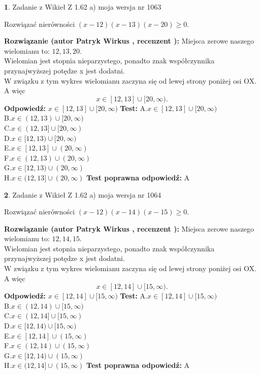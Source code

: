 \documentclass[12pt, a4paper]{article}
\theoremstyle{definition} %
\newtheorem{zad}{}
\newcommand{\zadStart}[1]{\begin{zad}#1\newline}
\newcommand{\zadStop}{\end{zad}}
\newcommand{\rozwStart}[2]{\noindent \textbf{Rozwiązanie (autor #1 , recenzent #2): }\newline}
\newcommand{\rozwStop}{\newline}
\newcommand{\odpStart}{\noindent \textbf{Odpowiedź:}\newline}
\newcommand{\odpStop}{\newline}
\newcommand{\testStart}{\noindent \textbf{Test:}\newline}
\newcommand{\testStop}{\newline}
\newcommand{\kluczStart}{\noindent \textbf{Test poprawna odpowiedź:}\newline}
\newcommand{\kluczStop}{\newline}
\begin{document}
\zadStart{Zadanie z Wikieł Z 1.62 a) moja wersja nr 1063}

Rozwiązać nierówności $(x-12)(x-13)(x-20)\ge0$.
\zadStop
\rozwStart{Patryk Wirkus}{}
Miejsca zerowe naszego wielomianu to: $12, 13, 20$.\\
Wielomian jest stopnia nieparzystego, ponadto znak współczynnika przy\linebreak najwyższej potędze x jest dodatni.\\ W związku z tym wykres wielomianu zaczyna się od lewej strony poniżej osi OX. A więc $$x \in [12,13] \cup [20,\infty).$$
\rozwStop
\odpStart
$x \in [12,13] \cup [20,\infty)$
\odpStop
\testStart
A.$x \in [12,13] \cup [20,\infty)$\\
B.$x \in (12,13) \cup [20,\infty)$\\
C.$x \in (12,13] \cup [20,\infty)$\\
D.$x \in [12,13) \cup [20,\infty)$\\
E.$x \in [12,13] \cup (20,\infty)$\\
F.$x \in (12,13) \cup (20,\infty)$\\
G.$x \in [12,13) \cup (20,\infty)$\\
H.$x \in (12,13] \cup (20,\infty)$
\testStop
\kluczStart
A
\kluczStop



\zadStart{Zadanie z Wikieł Z 1.62 a) moja wersja nr 1064}

Rozwiązać nierówności $(x-12)(x-14)(x-15)\ge0$.
\zadStop
\rozwStart{Patryk Wirkus}{}
Miejsca zerowe naszego wielomianu to: $12, 14, 15$.\\
Wielomian jest stopnia nieparzystego, ponadto znak współczynnika przy\linebreak najwyższej potędze x jest dodatni.\\ W związku z tym wykres wielomianu zaczyna się od lewej strony poniżej osi OX. A więc $$x \in [12,14] \cup [15,\infty).$$
\rozwStop
\odpStart
$x \in [12,14] \cup [15,\infty)$
\odpStop
\testStart
A.$x \in [12,14] \cup [15,\infty)$\\
B.$x \in (12,14) \cup [15,\infty)$\\
C.$x \in (12,14] \cup [15,\infty)$\\
D.$x \in [12,14) \cup [15,\infty)$\\
E.$x \in [12,14] \cup (15,\infty)$\\
F.$x \in (12,14) \cup (15,\infty)$\\
G.$x \in [12,14) \cup (15,\infty)$\\
H.$x \in (12,14] \cup (15,\infty)$
\testStop
\kluczStart
A
\kluczStop
\end{document}
